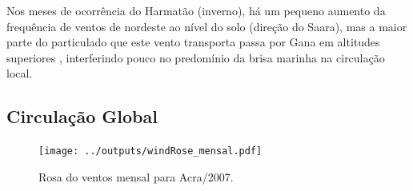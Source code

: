 Nos meses de ocorrência do Harmatão (inverno), há um pequeno aumento da 
frequência de ventos de nordeste ao nível do solo (direção do Saara), mas a 
maior parte do particulado que este vento transporta passa por Gana em 
altitudes superiores \citep{breuning2005}, interferindo pouco no predomínio 
da brisa marinha na circulação local.%

\subsection{Circulação Global}

\begin{figure}[H]
  \centering
  \texttt{[image: ../outputs/windRose\_mensal.pdf]}
  \caption{Rosa do ventos mensal para Acra/2007. \label{fig:windRose_mensal}}
\end{figure}

